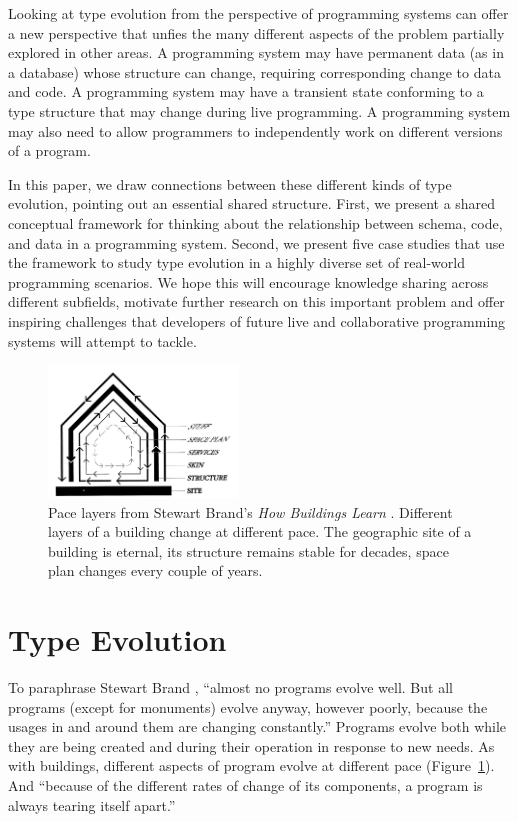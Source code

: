 \documentclass[english,submission]{programming}
\begin{document}
Looking at type evolution from the perspective of programming systems can offer a new perspective that
unfies the many different aspects of the problem partially explored in other areas. A programming
system may have permanent data (as in a database) whose structure can change, requiring
corresponding change to data and code. A programming system may have a transient state conforming
to a type structure that may change during live programming. A programming system may also need
to allow programmers to independently work on different versions of a program.

In this paper, we draw connections between these different kinds of type evolution, pointing out
an essential shared structure. First, we present a shared conceptual
framework for thinking about the relationship between schema, code, and data in a programming
system. Second, we present five case studies that use the framework to study type evolution in a
highly diverse set of real-world programming scenarios. We hope this will encourage knowledge
sharing across different subfields, motivate further research on this important problem and
offer inspiring challenges that developers of future live and collaborative programming systems
will attempt to tackle.

\begin{figure}[t]
\centering
\vspace{-1em}
\includegraphics[width=0.45\textwidth]{figures/layers.png}
\caption{Pace layers from Stewart Brand's \emph{How Buildings Learn} \cite{Brand95}.
  Different layers of a building change at different pace. The geographic
  site of a building is eternal, its structure remains stable for decades, space plan
  changes every couple of years.}
\label{fig:layers}
\end{figure}


\section{Type Evolution}
To paraphrase Stewart Brand \cite{Brand95}, ``almost no programs evolve well. But all programs
(except for monuments) evolve anyway, however poorly, because the usages in and around them are
changing constantly.'' Programs evolve both while they are being created and during their operation
in response to new needs. As with buildings, different aspects of program evolve at different pace
(Figure~\ref{fig:layers}). And ``because of the different rates of change of its components,
a program is always tearing itself apart.''
\end{document}
